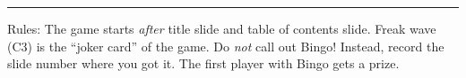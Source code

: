 \documentclass[a4paper, twocolumn]{article}
\newcounter{myletter}
\begin{document}
\begin{figure}[h!]
\begin{center}
  \end{center}
\end{figure}

\hrule
\vspace{2pt}
   \footnotesize{
     Rules: The game starts \emph{after} title slide and table of contents 
     slide. Freak wave (C3) is the ``joker card'' of the game. Do \emph{not} call
     out Bingo! Instead, record the slide number where you got it. The first
     player with Bingo gets a prize.
   }
\end{document}
